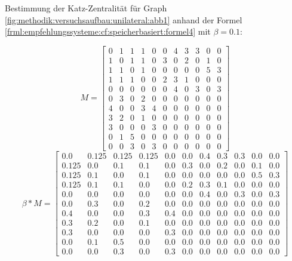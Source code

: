 Bestimmung der Katz-Zentralität für Graph \ref{fig:methodik:versuchsaufbau:unilateral:abb1} anhand der Formel \ref{frml:empfehlungssysteme:cf:speicherbasiert:formel4} mit $\beta = 0.1$:

\begin{equation}
	M = \begin{bmatrix}
		0 & 1 & 1 & 1 & 0 & 0 & 4 & 3 & 3 & 0 & 0\\
		1 & 0 & 1 & 1 & 0 & 3 & 0 & 2 & 0 & 1 & 0\\
		1 & 1 & 0 & 1 & 0 & 0 & 0 & 0 & 0 & 5 & 3\\
		1 & 1 & 1 & 0 & 0 & 2 & 3 & 1 & 0 & 0 & 0\\
		0 & 0 & 0 & 0 & 0 & 0 & 4 & 0 & 3 & 0 & 3\\
		0 & 3 & 0 & 2 & 0 & 0 & 0 & 0 & 0 & 0 & 0\\
		4 & 0 & 0 & 3 & 4 & 0 & 0 & 0 & 0 & 0 & 0\\
		3 & 2 & 0 & 1 & 0 & 0 & 0 & 0 & 0 & 0 & 0\\
		3 & 0 & 0 & 0 & 3 & 0 & 0 & 0 & 0 & 0 & 0\\
		0 & 1 & 5 & 0 & 0 & 0 & 0 & 0 & 0 & 0 & 0\\
		0 & 0 & 3 & 0 & 3 & 0 & 0 & 0 & 0 & 0 & 0
	\end{bmatrix}
	\label{frml:berechnungDerKatzZentralitaetPseudoMitarbeiter:formel1}
\end{equation}
\begin{equation}
	\beta * M = \begin{bmatrix}
		0.0 & 0.125 & 0.125 & 0.125 & 0.0 & 0.0 & 0.4 & 0.3 & 0.3 & 0.0 & 0.0\\
		0.125 & 0.0 & 0.1 & 0.1 & 0.0 & 0.3 & 0.0 & 0.2 & 0.0 & 0.1 & 0.0\\
		0.125 & 0.1 & 0.0 & 0.1 & 0.0 & 0.0 & 0.0 & 0.0 & 0.0 & 0.5 & 0.3\\
		0.125 & 0.1 & 0.1 & 0.0 & 0.0 & 0.2 & 0.3 & 0.1 & 0.0 & 0.0 & 0.0\\
		0.0 & 0.0 & 0.0 & 0.0 & 0.0 & 0.0 & 0.4 & 0.0 & 0.3 & 0.0 & 0.3\\
		0.0 & 0.3 & 0.0 & 0.2 & 0.0 & 0.0 & 0.0 & 0.0 & 0.0 & 0.0 & 0.0\\
		0.4 & 0.0 & 0.0 & 0.3 & 0.4 & 0.0 & 0.0 & 0.0 & 0.0 & 0.0 & 0.0\\
		0.3 & 0.2 & 0.0 & 0.1 & 0.0 & 0.0 & 0.0 & 0.0 & 0.0 & 0.0 & 0.0\\
		0.3 & 0.0 & 0.0 & 0.0 & 0.3 & 0.0 & 0.0 & 0.0 & 0.0 & 0.0 & 0.0\\
		0.0 & 0.1 & 0.5 & 0.0 & 0.0 & 0.0 & 0.0 & 0.0 & 0.0 & 0.0 & 0.0\\
		0.0 & 0.0 & 0.3 & 0.0 & 0.3 & 0.0 & 0.0 & 0.0 & 0.0 & 0.0 & 0.0
	\end{bmatrix}
	\label{frml:katzZentralitaetPseudoMitarbeiter:formel2}
\end{equation}
